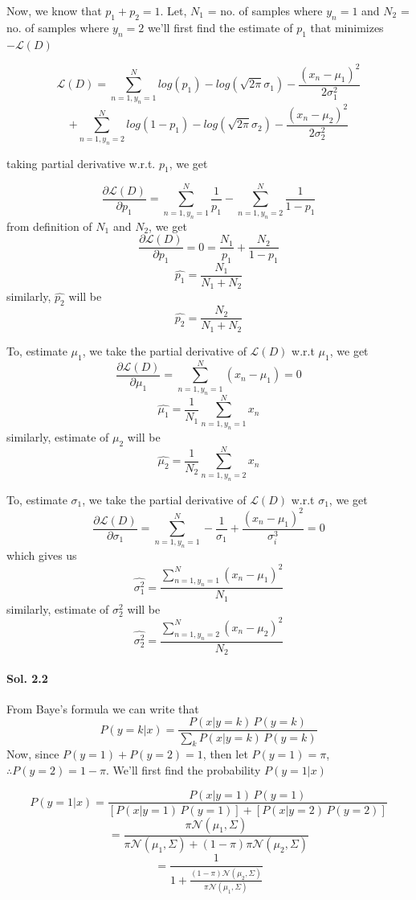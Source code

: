 \documentclass[]{report}
\begin{document}
		Now, we know that $p_1 + p_2 = 1$. Let, $N_1$ = no. of samples where $y_n = 1$ and $N_2$ = no. of samples where $y_n = 2$
		we'll first find the estimate of $p_1$ that minimizes $-\mathcal{L}(D)$

		\[ \mathcal{L}(D) = \sum_{n=1, y_n = 1}^N log(p_1) - log(\sqrt{2\pi}\sigma_1) - \frac{(x_n - \mu_1)^2}{2\sigma_1^2} \]
		\[ + \sum_{n=1, y_n = 2}^N log(1 - p_1) - log(\sqrt{2\pi}\sigma_2) - \frac{(x_n - \mu_2)^2}{2\sigma_2^2} \]

		taking partial derivative w.r.t. $p_1$, we get

		\[ \frac{\partial{\mathcal{L}(D)}}{\partial{p_1}} = \sum_{n=1, y_n = 1}^N \frac{1}{p_1} - \sum_{n=1, y_n = 2}^N \frac{1}{1 - p_1} \]
		from definition of $N_1$ and $N_2$, we get
		\[ \frac{\partial{\mathcal{L}(D)}}{\partial{p_1}} = 0 = \frac{N_1}{p_1} + \frac{N_2}{1 -p_1} \]
		\[ \hat{p_1} = \frac{N_1}{N_1 + N_2}\]
		similarly, $\hat{p_2}$ will be
		\[ \hat{p_2} = \frac{N_2}{N_1 + N_2}\]

		To, estimate $\mu_1$, we take the partial derivative of $\mathcal{L}(D)$ w.r.t $\mu_1$, we get
		\[ \frac{\partial{\mathcal{L}(D)}}{\partial{\mu_1}} = \sum_{n=1, y_n = 1}^N (x_n - \mu_1) = 0\]
		\[ \hat{\mu_1} = \frac{1}{N_1} \sum_{n=1, y_n = 1}^N x_n\]
		similarly, estimate of $\mu_2$ will be 
		\[ \hat{\mu_2} = \frac{1}{N_2} \sum_{n=1, y_n = 2}^N x_n\]

		To, estimate $\sigma_1$, we take the partial derivative of $\mathcal{L}(D)$ w.r.t $\sigma_1$, we get
		\[ \frac{\partial{\mathcal{L}(D)}}{\partial{\sigma_1}} = \sum_{n=1, y_n = 1}^N - \frac{1}{\sigma_1} + \frac{(x_n - \mu_1)^2}{\sigma_i^3} = 0\]
		which gives us
		\[ \hat{\sigma_1^2} = \frac{\sum_{n=1, y_n = 1}^N (x_n - \mu_1)^2}{N_1} \]
		similarly, estimate of $\sigma_2^2$ will be 
		\[ \hat{\sigma_2^2} = \frac{\sum_{n=1, y_n = 2}^N (x_n - \mu_2)^2}{N_2} \]

	\paragraph{Sol. 2.2}
		From Baye's formula we can write that 
		\[ P(y = k | x) = \frac{P(x | y = k)\, P(y = k)}{\sum_k P(x | y = k)\, P(y = k)} \]
		Now, since $P(y = 1) + P(y = 2) = 1$, then let $P(y = 1) = \pi$, $\therefore P(y = 2) = 1 - \pi$.
		We'll first find the probability $P(y = 1| x)$

		\[ P(y = 1| x) = \frac{P(x|y = 1)\, P(y = 1)}{ [P(x | y = 1)\, P(y = 1)] + [P(x | y = 2)\, P(y = 2)]} \]
		\[ = \frac{\pi \mathcal{N}(\mu_1, \Sigma)}{\pi \mathcal{N}(\mu_1, \Sigma) + (1 - \pi)\pi \mathcal{N}(\mu_2, \Sigma)} \]
		\[ = \frac{1}{1 + \frac{(1 - \pi) \mathcal{N}(\mu_2, \Sigma)}{\pi \mathcal{N}(\mu_1, \Sigma)}}\]
\end{document}
